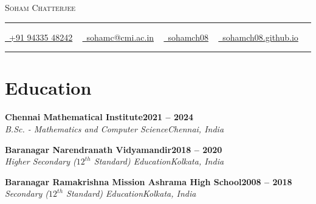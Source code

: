 \documentclass[letterpaper,10pt]{article}
\newcommand{\documentTitle}[2]{
  \begin{center}
    {\Huge\scshape\color{accentTitle} #1}
    \vspace{10pt}
    {\color{accentLine} \hrule}
    \vspace{2pt}
    \footnotesize{#2}
    \vspace{2pt}
    {\color{accentLine} \hrule}
  \end{center}
}
\newcommand{\tinysection}[1]{
  \phantomsection
  \addcontentsline{toc}{section}{#1}
  {\scshape\large{\bfseries\color{accentText}#1} {\color{accentLine} |}}
}
\newcommand{\heading}[2]{
  \hspace{0pt}#1\hfill#2\\
}
\newcommand{\headingBf}[2]{
  \heading{\textbf{#1}}{\textbf{#2}}
}
\newcommand{\headingIt}[2]{
  \heading{\textit{#1}}{\textit{#2}}
}
\newenvironment{resume_list}{
  \vspace{-7pt}
  \begin{itemize}[itemsep=-2px, parsep=1pt, leftmargin=30pt, label={$\circ$}]
}{
  \end{itemize}
}
\begin{document}

  \documentTitle{Soham Chatterjee}{
    \href{tel:+919433548242}{
      \raisebox{-0.05\height} \faPhone\ +91 94335 48242} ~
    \href{mailto:sohamc@cmi.ac.in}{
      \raisebox{-0.15\height} \faEnvelope\ sohamc@cmi.ac.in} ~
    \href{https://github.com/sohamch08}{
      \raisebox{-0.15\height} \faGithub\ sohamch08} ~
   \href{https://sohamch08.github.io}{
  	\raisebox{-0.15\height} \faGlobe\ sohamch08.github.io}
  }

%


  \section{Education}


\begin{resume_list}
	\item \headingBf{Chennai Mathematical Institute}{2021 -- 2024}
	\headingIt{B.Sc. - Mathematics and Computer Science}{Chennai, India}
	\item \headingBf{Baranagar Narendranath Vidyamandir}{2018 -- 2020}
	\headingIt{Higher Secondary ($12^{th}$ Standard) Education}{Kolkata, India}
	\item \headingBf{Baranagar Ramakrishna Mission Ashrama High School}{2008 -- 2018}
	\headingIt{Secondary ($12^{th}$ Standard) Education}{Kolkata, India}
\end{resume_list}
\end{document}
